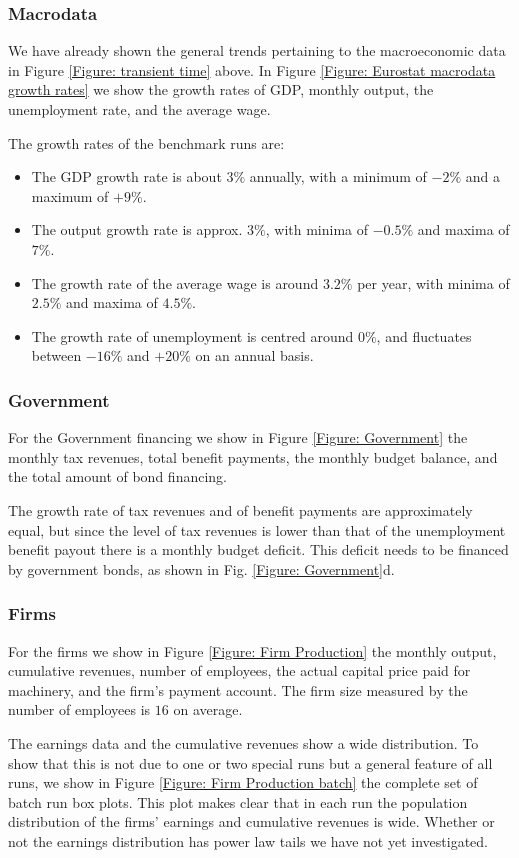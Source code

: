 \subsubsection*{Macrodata}
We have already shown the general trends pertaining to the macroeconomic data in Figure \ref{Figure: transient time} above. 
In Figure \ref{Figure: Eurostat macrodata growth rates} we show the growth rates of GDP, monthly output, the unemployment rate, and the average wage.

The growth rates of the benchmark runs are:
\begin{itemize}
\item The GDP growth rate is about $3\%$ annually, with a minimum of $-2\%$ and a maximum of $+9\%$.
\item The output growth rate is approx. $3\%$, with minima of $-0.5\%$ and maxima of $7\%$.
\item The growth rate of the average wage is around $3.2\%$ per year, with minima of $2.5\%$ and maxima of $4.5\%$.
\item The growth rate of unemployment is centred around $0\%$, and fluctuates between $-16\%$ and $+20\%$ on an annual basis.
\end{itemize}

\subsubsection*{Government}
For the Government financing we show in Figure \ref{Figure: Government} the monthly tax revenues, total benefit payments, the monthly budget balance,
and the total amount of bond financing.

The growth rate of tax revenues and of benefit payments are approximately equal, but
since the level of tax revenues is lower than that of the unemployment benefit payout there is a monthly budget deficit.
This deficit needs to be financed by government bonds, as shown in Fig. \ref{Figure: Government}d.

\subsubsection*{Firms}
For the firms we show in Figure \ref{Figure: Firm Production} the monthly output, cumulative revenues, number of employees, the actual capital price paid for machinery, and the firm's payment account. The firm size measured by the number of employees is $16$ on average.

The earnings data and the cumulative revenues show a wide distribution. To show that this is not due to one or two special runs but a general feature of all runs, we  show in Figure \ref{Figure: Firm Production batch} the complete set of batch run box plots. This plot makes clear that in each run the population distribution of the firms' earnings and cumulative revenues is wide.
Whether or not the earnings distribution has power law tails we have not yet investigated.

